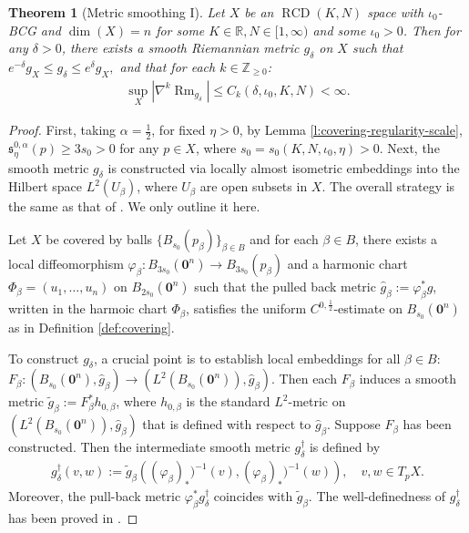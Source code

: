 \documentclass[11pt,reqno]{amsart}
\newtheorem{theorem}{Theorem}[section]
\theoremstyle{definition}
\numberwithin{equation}{section}
\DeclareMathOperator{\RCD}{RCD}
\DeclareMathOperator{\Rm}{Rm}
\begin{document}
\begin{theorem}[Metric smoothing I]
\label{t:main-smoothing}
Let $X$ be an $\RCD(K, N)$ space with $\iota_0$-BCG and $\dim(X) = n$ for some $K \in \mathbb{R}, N \in [1, \infty)$ and some $\iota_0>0$. 
Then for any $\delta > 0$, there exists a smooth Riemannian metric $g_{\delta}$ on $X$ such that  
$
	 e^{-\delta} g_X  \leq g_{\delta}  \leq e^{\delta} g_X,
$
and that for each $k\in \mathbb{Z}_{\ge 0}$:
	  \begin{align}
 \sup\limits_{X} |\nabla^k \Rm_{g_{\delta}}| \leq C_k (\delta,  \iota_0, K, N)<\infty.  
  \end{align} 
\end{theorem}
\begin{proof}
 

First, taking $\alpha=\frac{1}{2}$, for fixed $\eta > 0$, by Lemma \ref{l:covering-regularity-scale}, 
$\mathfrak{s}_{\eta}^{0,\alpha}(p) \geq 3 s_0 > 0$ for any $p \in X$, where $s_0 = s_0 (K, N, \iota_0, \eta)>0$.
Next, the smooth metric $g_{\delta}$ is constructed via   locally almost isometric embeddings  into the Hilbert space $L^2(U_{\beta})$, where $U_{\beta}$ are open subsets in $X$.
The overall strategy is the same as that of \cite{PWY}. We only outline it here.


Let $X$ be covered by balls $\{B_{s_0} (p_{\beta})\}_{\beta \in B}$ and for each $\beta \in B$,
there exists a local diffeomorphism $\varphi_{\beta}: B_{3 s_0}(\bm{0}^n) \to B_{3 s_0}(p_{\beta})$
and a harmonic chart $\Phi_{\beta} = (u_1,\ldots, u_n)$ on $B_{2 s_0}(\bm{0}^n)$ 
such that the pulled back metric $\hat{g}_{\beta} := \varphi_{\beta}^* g$, written in the harmoic chart $\Phi_{\beta}$, satisfies the uniform $C^{0,\frac{1}{2}}$-estimate on $B_{s_0}(\bm{0}^n)$ as in Definition \ref{def:covering}.

To construct $g_{\delta}$, a crucial point is to establish local embeddings for all $\beta \in B$: 
$
    F_{\beta}: (B_{s_0} (\bm{0}^n), \hat{g}_{\beta}) \to (L^2(B_{s_0} (\bm{0}^n)), \hat{g}_{\beta}).
$
 Then each $F_{\beta}$ induces a smooth metric $\tilde{g}_{\beta} := F_{\beta}^* h_{0, \beta}$, where $h_{0, \beta}$ is the standard $L^2$-metric on $(L^2(B_{s_0}(\bm{0}^n)), \hat{g}_{\beta})$ that 
is defined with respect to $\hat{g}_{\beta}$.
Suppose $F_{\beta}$ has been constructed. Then the intermediate smooth metric $g_{\delta}^{\dag}$ is defined by
 \begin{align}
g_{\delta}^{\dag} (v, w) :=  
\tilde{g}_{\beta}
\left( (\varphi_{\beta})_*)^{-1} (v) , (\varphi_{\beta})_*)^{-1} (w)\right), \quad v,w\in T_pX.
\end{align}
Moreover, the pull-back metric $\varphi_{\beta}^* g_{\delta}^{\dag}$ coincides with $\tilde{g}_{\beta}$.
The well-definedness of $g_{\delta}^{\dag}$ 
has been proved in \cite[Lemma 3.2]{PWY}.


\end{proof}
\end{document}
